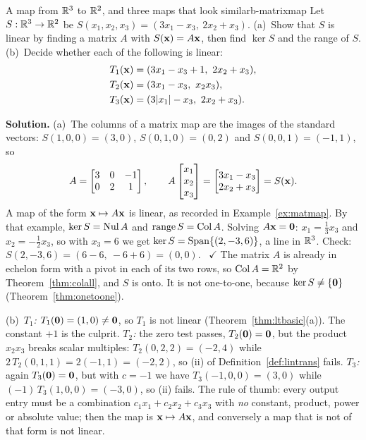\documentclass[11pt]{article}
\begin{document}
\begin{exmp}{A map from $\mathbb{R}^3$ to $\mathbb{R}^2$, and three maps that look similar}{b-matrixmap}
Let $S:\mathbb{R}^3\to\mathbb{R}^2$ be $S(x_1,x_2,x_3)=(3x_1-x_3,\ 2x_2+x_3)$. (a)~Show that $S$ is linear by finding a matrix $A$ with $S(\mathbf{x})=A\mathbf{x}$, then find $\ker S$ and the range of $S$. (b)~Decide whether each of the following is linear:
\begin{align*}
T_1(\mathbf{x})&=(3x_1-x_3+1,\ 2x_2+x_3),\\
T_2(\mathbf{x})&=(3x_1-x_3,\ x_2x_3),\\
T_3(\mathbf{x})&=(3|x_1|-x_3,\ 2x_2+x_3).
\end{align*}

\textbf{Solution.} (a)~The columns of a matrix map are the images of the standard vectors: $S(1,0,0)=(3,0)$, $S(0,1,0)=(0,2)$ and $S(0,0,1)=(-1,1)$, so
\[
A=\begin{bmatrix}3&0&-1\\0&2&1\end{bmatrix},\qquad A\begin{bmatrix}x_1\\x_2\\x_3\end{bmatrix}=\begin{bmatrix}3x_1-x_3\\2x_2+x_3\end{bmatrix}=S(\mathbf{x}).
\]
A map of the form $\mathbf{x}\mapsto A\mathbf{x}$ is linear, as recorded in Example~\ref{ex:matmap}. By that example, $\ker S=\operatorname{Nul} A$ and $\operatorname{range}S=\operatorname{Col} A$. Solving $A\mathbf{x}=\mathbf{0}$: $x_1=\tfrac13x_3$ and $x_2=-\tfrac12x_3$, so with $x_3=6$ we get $\ker S=\operatorname{Span}\{(2,-3,6)\}$, a line in $\mathbb{R}^3$. Check: $S(2,-3,6)=(6-6,\ -6+6)=(0,0)$. \ $\checkmark$ The matrix $A$ is already in echelon form with a pivot in each of its two rows, so $\operatorname{Col} A=\mathbb{R}^2$ by Theorem~\ref{thm:colall}, and $S$ is onto. It is not one-to-one, because $\ker S\neq\{\mathbf{0}\}$ (Theorem~\ref{thm:onetoone}).

(b)~\emph{$T_1$:} $T_1(\mathbf{0})=(1,0)\neq\mathbf{0}$, so $T_1$ is not linear (Theorem~\ref{thm:ltbasic}(a)). The constant $+1$ is the culprit. \emph{$T_2$:} the zero test passes, $T_2(\mathbf{0})=\mathbf{0}$, but the product $x_2x_3$ breaks scalar multiples: $T_2(0,2,2)=(-2,4)$ while $2\,T_2(0,1,1)=2(-1,1)=(-2,2)$, so (ii) of Definition~\ref{def:lintrans} fails. \emph{$T_3$:} again $T_3(\mathbf{0})=\mathbf{0}$, but with $c=-1$ we have $T_3(-1,0,0)=(3,0)$ while $(-1)\,T_3(1,0,0)=(-3,0)$, so (ii) fails. The rule of thumb: every output entry must be a combination $c_1x_1+c_2x_2+c_3x_3$ with \emph{no} constant, product, power or absolute value; then the map is $\mathbf{x}\mapsto A\mathbf{x}$, and conversely a map that is not of that form is not linear.
\end{exmp}
\end{document}
